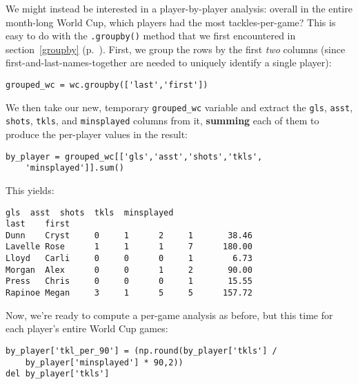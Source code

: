 
We might instead be interested in a player-by-player analysis: overall in the
entire month-long World Cup, which players had the most tackles-per-game? This
is easy to do with the \texttt{.groupby()} method that we first encountered in
section~\ref{groupby} (p.~\pageref{groupby}). First, we group the rows by the
first \textit{two} columns (since first-and-last-names-together are needed to
uniquely identify a single player):


\begin{Verbatim}[fontsize=\footnotesize,samepage=true,frame=single,framesep=3mm]
grouped_wc = wc.groupby(['last','first'])
\end{Verbatim}

We then take our new, temporary \texttt{grouped\_wc} variable and extract the
\texttt{gls}, \texttt{asst}, \texttt{shots}, \texttt{tkls}, and
\texttt{minsplayed} columns from it, \textbf{summing} each of them to produce
the per-player values in the result:


\begin{Verbatim}[fontsize=\footnotesize,samepage=true,frame=single,framesep=3mm]
by_player = grouped_wc[['gls','asst','shots','tkls',
    'minsplayed']].sum()
\end{Verbatim}

This yields:

\begin{Verbatim}[fontsize=\small,samepage=true,frame=leftline,framesep=5mm,framerule=1mm]
                gls  asst  shots  tkls  minsplayed
last    first                                             
Dunn    Cryst     0     1      2     1       38.46
Lavelle Rose      1     1      1     7      180.00
Lloyd   Carli     0     0      0     1        6.73
Morgan  Alex      0     0      1     2       90.00
Press   Chris     0     0      0     1       15.55
Rapinoe Megan     3     1      5     5      157.72
\end{Verbatim}

Now, we're ready to compute a per-game analysis as before, but this time for
each player's entire World Cup games:

\begin{Verbatim}[fontsize=\small,samepage=true,frame=single,framesep=3mm]
by_player['tkl_per_90'] = (np.round(by_player['tkls'] /
    by_player['minsplayed'] * 90,2))
del by_player['tkls']
\end{Verbatim}
\vspace{-.2in}

